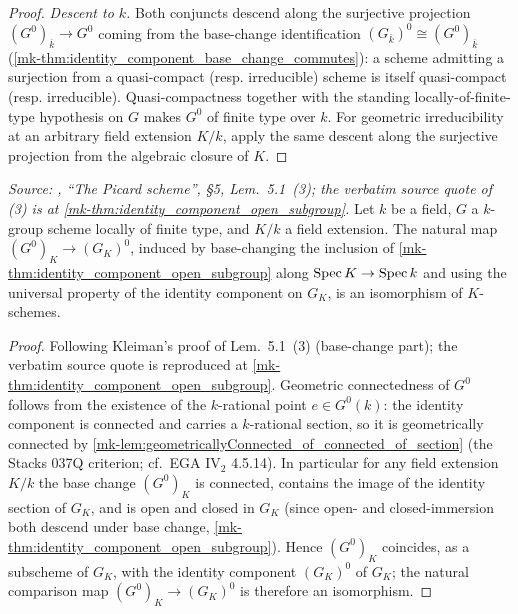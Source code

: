 \begin{proof}
  \emph{Descent to \(k\).}  Both conjuncts descend along the surjective
  projection \((G^0)_{\overline k} \to G^0\) coming from the base-change
  identification \((G_{\overline k})^0 \cong (G^0)_{\overline k}\)
  (\ref{mk-thm:identity_component_base_change_commutes}): a scheme admitting a
  surjection from a quasi-compact (resp. irreducible) scheme is itself
  quasi-compact (resp. irreducible). Quasi-compactness together with the
  standing locally-of-finite-type hypothesis on \(G\) makes \(G^0\) of
  finite type over \(k\). For geometric irreducibility at an arbitrary field
  extension \(K/k\), apply the same descent along the surjective projection
  from the algebraic closure of \(K\).
\end{proof}

\begin{theorem}\label{mk-thm:identity_component_base_change_commutes}
  \leanok

  \textit{Source: \cite{kleiman-picard}, ``The Picard scheme'', \S 5,
  Lem.~5.1~(3); the verbatim source quote of (3) is at
  \ref{mk-thm:identity_component_open_subgroup}.}
  Let \(k\) be a field, \(G\) a \(k\)-group scheme locally of finite
  type, and \(K/k\) a field extension. The natural map
  \((G^0)_K \to (G_K)^0\), induced by base-changing the inclusion of
  \ref{mk-thm:identity_component_open_subgroup} along \(\operatorname{Spec} K \to \operatorname{Spec} k\)
  and using the universal property of the identity component on
  \(G_K\), is an isomorphism of \(K\)-schemes.
\end{theorem}

\begin{proof}
  \leanok
  Following Kleiman's proof of Lem.~5.1~(3) (base-change part); the
  verbatim source quote is reproduced at
  \ref{mk-thm:identity_component_open_subgroup}.
  Geometric connectedness of \(G^0\) follows from the existence of the
  \(k\)-rational point \(e \in G^0(k)\): the identity component is
  connected and carries a \(k\)-rational section, so it is geometrically
  connected by
  \ref{mk-lem:geometricallyConnected_of_connected_of_section} (the
  Stacks 037Q criterion; cf.\ EGA IV\(_2\) 4.5.14). In particular for
  any field extension \(K/k\) the base change \((G^0)_K\) is connected,
  contains the image of the identity section of \(G_K\), and is open and
  closed in \(G_K\) (since open- and closed-immersion both descend under
  base change, \ref{mk-thm:identity_component_open_subgroup}). Hence
  \((G^0)_K\) coincides, as a subscheme of \(G_K\), with the identity
  component \((G_K)^0\) of \(G_K\); the natural comparison map
  \((G^0)_K \to (G_K)^0\) is therefore an isomorphism.
\end{proof}

